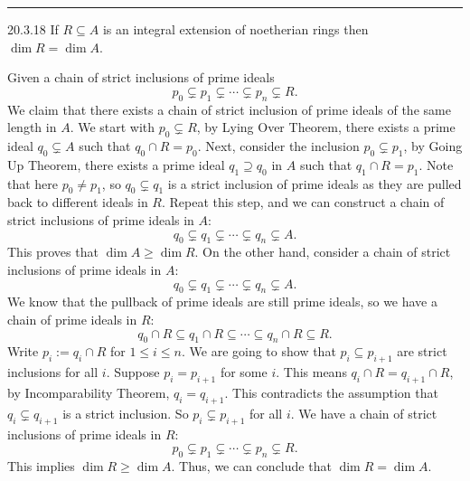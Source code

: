 \documentclass[letterpaper, 12pt]{article}
\begin{document}
\noindent\rule{7in}{2.8pt}
\begin{problem}{20.3.18}
If \(R\subseteq A\) is an integral extension of noetherian rings then \(\dim R=\dim A\). 
\end{problem}
\begin{solution}
Given a chain of strict inclusions of prime ideals 
\[p_0\subsetneq p_1\subsetneq \cdots\subsetneq p_n\subsetneq R.\] 
We claim that there exists a chain of strict inclusion of prime ideals of the same length in \(A\). We start with \(p_0\subsetneq R\), by Lying Over Theorem, there exists a prime ideal \(q_0\subsetneq A\) such that \(q_0\cap R=p_0\). Next, consider the inclusion \(p_0\subsetneq p_1\), by Going Up Theorem, there exists a prime ideal \(q_1\supseteq q_0\) in \(A\) such that \(q_1\cap R=p_1\). Note that here \(p_0\neq p_1\), so \(q_0\subsetneq q_1\) is a strict inclusion of prime ideals as they are pulled back to different ideals in \(R\). Repeat this step, and we can construct a chain of strict inclusions of prime ideals in \(A\):
\[q_0\subsetneq q_1\subsetneq \cdots\subsetneq q_n\subsetneq A.\]
This proves that \(\dim A\geq \dim R\). On the other hand, consider a chain of strict inclusions of prime ideals in \(A\):
\[q_0\subsetneq q_1\subsetneq \cdots\subsetneq q_n\subsetneq A.\]
We know that the pullback of prime ideals are still prime ideals, so we have a chain of prime ideals in \(R\):
\[q_0\cap R\subseteq q_1\cap R\subseteq \cdots\subseteq q_n\cap R\subseteq R.\]
Write \(p_i:=q_i\cap R\) for \(1\leq i\leq n\). We are going to show that \(p_i\subseteq p_{i+1}\) are strict inclusions for all \(i\). Suppose \(p_i=p_{i+1}\) for some \(i\). This means \(q_i\cap R=q_{i+1}\cap R\), by Incomparability Theorem, \(q_i=q_{i+1}\). This contradicts the assumption that \(q_i\subsetneq q_{i+1}\) is a strict inclusion. So \(p_i\subsetneq p_{i+1}\) for all \(i\). We have a chain of strict inclusions of prime ideals in \(R\):
\[p_0\subsetneq p_1\subsetneq \cdots\subsetneq p_n\subsetneq R.\] 
This implies \(\dim R\geq \dim A\). Thus, we can conclude that \(\dim R=\dim A\). 
\end{solution}
\end{document}
